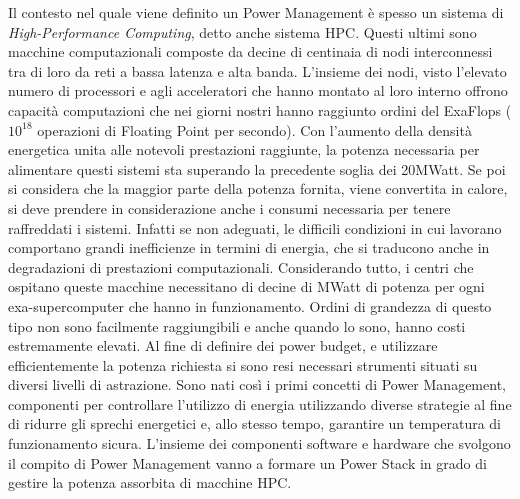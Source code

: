Il contesto nel quale viene definito un Power Management è spesso un sistema di \emph{High-Performance Computing}, detto anche sistema HPC. Questi ultimi sono macchine computazionali composte da decine di centinaia di nodi interconnessi tra di loro da reti a bassa latenza e alta banda. L'insieme dei nodi, visto l'elevato numero di processori e agli acceleratori che hanno montato al loro interno offrono capacità computazioni che nei giorni nostri hanno raggiunto ordini del ExaFlops ($10^{18}$ operazioni di  Floating Point per secondo).
Con l'aumento della densità energetica unita alle notevoli prestazioni raggiunte, la potenza necessaria per alimentare questi sistemi sta superando la precedente soglia dei 20MWatt. Se poi si considera che la maggior parte della potenza fornita, viene convertita in calore, si deve prendere in considerazione anche i consumi necessaria per tenere raffreddati i sistemi. Infatti se non adeguati, le difficili condizioni in cui lavorano comportano grandi inefficienze in termini di energia, che si traducono anche in degradazioni di prestazioni computazionali. 
Considerando tutto, i centri che ospitano queste macchine necessitano di decine di MWatt di potenza per ogni exa-supercomputer che hanno in funzionamento. 
Ordini di grandezza di questo tipo non sono facilmente raggiungibili e anche quando lo sono, hanno costi estremamente elevati. 
Al fine di definire dei power budget, e utilizzare efficientemente la potenza richiesta si sono resi necessari strumenti situati su diversi livelli di astrazione. 
Sono nati così i primi concetti di Power Management, componenti per controllare l'utilizzo di energia utilizzando diverse strategie al fine di ridurre gli sprechi energetici e, allo stesso tempo, garantire un temperatura di funzionamento sicura.%
L'insieme dei componenti software e hardware che svolgono il compito di Power Management vanno a formare un Power Stack in grado di gestire la potenza assorbita di macchine HPC.

